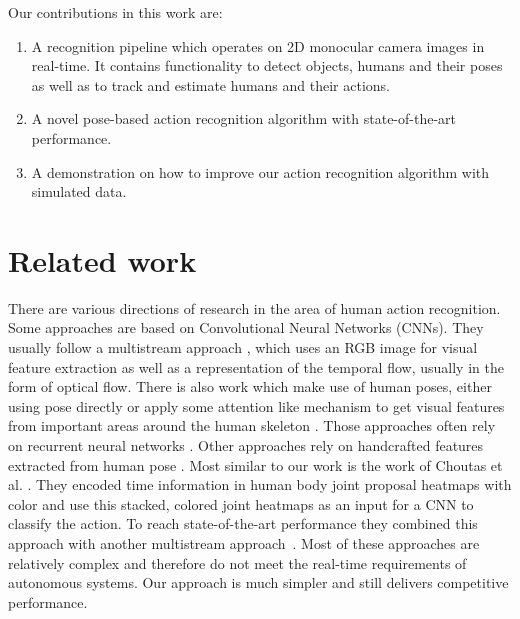 \documentclass[a4paper, 10pt, conference]{ieeeconf}
\begin{document}
Our contributions in this work are:

\begin{enumerate}
\item A recognition pipeline which operates on 2D monocular camera images in real-time. It contains functionality to detect objects, humans and their poses as well as to track and estimate humans and their actions.
\item A novel pose-based action recognition algorithm with state-of-the-art performance.
\item A demonstration on how to improve our action recognition algorithm with simulated data.
\end{enumerate}


\section{Related work}
There are various directions of research in the area of human action recognition. Some approaches are based on Convolutional Neural Networks (CNNs). They usually follow a multistream approach \cite{huangHumanActionRecognition2019, tuMultistreamCNNLearning2018, zolfaghariChainedMultistreamNetworks2017}, which uses an RGB image for visual feature extraction as well as a representation of the temporal flow, usually in the form of optical flow. There is also work which make use of human poses, either using pose directly \cite{huangHumanActionRecognition2019, zolfaghariChainedMultistreamNetworks2017} or apply some attention like mechanism to get visual features from important areas around the human skeleton \cite{tuMultistreamCNNLearning2018, duRPANEndtoEndRecurrent2017}. Those approaches often rely on recurrent neural networks \cite{angeliniActionXPoseNovel2D2018, duRPANEndtoEndRecurrent2017, songEndtoEndSpatioTemporalAttention2017}. Other approaches rely on handcrafted features extracted from human pose \cite{fangOnBoardDetectionPedestrian2017, garbadeHandcraftingVsDeep2016}. Most similar to our work is the work of Choutas et al. \cite{choutasPoTionPoseMoTion2018}. They encoded time information in human body joint proposal heatmaps with color and use this stacked, colored joint heatmaps as an input for a CNN to classify the action. To reach state-of-the-art performance they combined this approach with another multistream approach~\cite{carreiraQuoVadisAction2017}. Most of these approaches are relatively complex and therefore do not meet the real-time requirements of autonomous systems. Our approach is much simpler and still delivers competitive performance.
\end{document}
